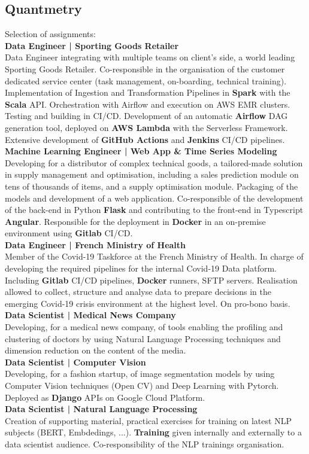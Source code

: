 \documentclass{article}
\newcommand{\longdescript}[1]{\color{subheadings}\normalfont\small {#1\\}}
\newcommand{\experience}[1]{\color{darkgray}\normalfont \textbf{#1\\}}
\newcommand{\experiencedescript}[1]{\color{subheadings}\normalfont\small {#1\\[3pt]}}
\newcommand{\location}[1]{\color{primary}\headingfont {\hfill #1\\} }
\newcommand{\sectionsep}[0]{\vspace{-6pt}}
\newcommand{\pipe}{\hspace{1pt} | \hspace{1pt} }
\begin{document}
\subsection{Quantmetry}
\location{Paris, France | Sept 2019 - Today}
\longdescript{Selection of assignments:}
\experience{Data Engineer \pipe Sporting Goods Retailer}
\experiencedescript{Data Engineer integrating with multiple teams on client's side, a world leading Sporting Goods Retailer. Co-responsible in the organisation of the customer dedicated service center (task management, on-boarding, technical training). Implementation of Ingestion and Transformation Pipelines in \textbf{Spark} with the \textbf{Scala} API. Orchestration with Airflow and execution on AWS EMR clusters. Testing and building in CI/CD. Development of an automatic \textbf{Airflow} DAG generation tool, deployed on \textbf{AWS Lambda} with the Serverless Framework. Extensive development of \textbf{GitHub Actions} and \textbf{Jenkins} CI/CD pipelines.}
\experience{Machine Learning Engineer \pipe Web App \& Time Series Modeling}
\experiencedescript{Developing for a distributor of complex technical goods, a tailored-made solution in supply management and optimisation, including a sales prediction module on tens of thousands of items, and a supply optimisation module. Packaging of the models and development of a web application. Co-responsible of the development of the back-end in Python \textbf{Flask} and contributing to the front-end in Typescript \textbf{Angular}. Responsible for the deployment in \textbf{Docker} in an on-premise environment using \textbf{Gitlab} CI/CD.}
\experience{Data Engineer \pipe French Ministry of Health }
\experiencedescript{Member of the Covid-19 Taskforce at the French Ministry of Health. In charge of developing the required pipelines for the internal Covid-19 Data platform. Including \textbf{Gitlab} CI/CD pipelines, \textbf{Docker} runners, SFTP servers. Realisation allowed to collect, structure and analyse data to prepare decisions in the emerging Covid-19 crisis environment at the highest level. On pro-bono basis.}
\experience{Data Scientist \pipe Medical News Company }
\experiencedescript{Developing, for a medical news company, of tools enabling the profiling and clustering of doctors by using Natural Language Processing techniques and dimension reduction on the content of the media.}
\experience{Data Scientist \pipe Computer Vision}
\experiencedescript{Developing, for a fashion startup, of image segmentation models by using Computer Vision techniques (Open CV) and Deep Learning with Pytorch. Deployed as \textbf{Django} APIs on Google Cloud Platform.}
\experience{Data Scientist \pipe Natural Language Processing}
\experiencedescript{Creation of supporting material, practical exercises for training on latest NLP subjects (BERT, Embdedings,  ...). \textbf{Training} given internally and externally to a data scientist audience. Co-responsibility of the NLP trainings organisation.}
\sectionsep
\end{document}
